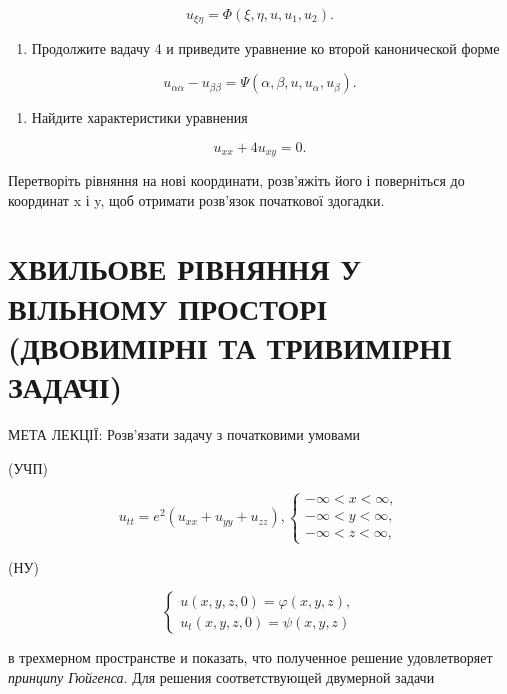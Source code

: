 \documentclass[
  ukrainian,
]{article}
\providecommand{\tightlist}{%
  \setlength{\itemsep}{0pt}\setlength{\parskip}{0pt}}
\begin{document}
\[
u_{\xi\eta} = \Phi(\xi, \eta, u, u_1, u_2).
\]

\begin{enumerate}
\def\labelenumi{\arabic{enumi}.}
\setcounter{enumi}{4}
\tightlist
\item
  Продолжите вадачу 4 и приведите уравнение ко второй канонической форме
\end{enumerate}

\[
u_{\alpha\alpha} - u_{\beta\beta} = \Psi(\alpha, \beta, u, u_{\alpha}, u_{\beta}).
\]

\begin{enumerate}
\def\labelenumi{\arabic{enumi}.}
\setcounter{enumi}{5}
\tightlist
\item
  Найдите характеристики уравнения
\end{enumerate}

\[
u_{xx} + 4u_{xy} = 0.
\]

Перетворіть рівняння на нові координати, розв'яжіть його і поверніться
до координат x і y, щоб отримати розв'язок початкової здогадки.

\section{ХВИЛЬОВЕ РІВНЯННЯ У ВІЛЬНОМУ ПРОСТОРІ (ДВОВИМІРНІ ТА ТРИВИМІРНІ
ЗАДАЧІ)}\label{ux445ux432ux438ux43bux44cux43eux432ux435-ux440ux456ux432ux43dux44fux43dux43dux44f-ux443-ux432ux456ux43bux44cux43dux43eux43cux443-ux43fux440ux43eux441ux442ux43eux440ux456-ux434ux432ux43eux432ux438ux43cux456ux440ux43dux456-ux442ux430-ux442ux440ux438ux432ux438ux43cux456ux440ux43dux456-ux437ux430ux434ux430ux447ux456}

МЕТА ЛЕКЦІЇ: Розв'язати задачу з початковими умовами

(УЧП)

\[
u_{tt} = e^{2} (u_{xx} + u_{yy} + u_{zz}),
\begin{cases} -\infty < x < \infty, \\ -\infty < y < \infty, \\ -\infty < z < \infty, \end{cases}
\]

(НУ)

\[
\begin{cases} u(x, y, z, 0) = \varphi(x, y, z), \\ u_{t}(x, y, z, 0) = \psi(x, y, z) \end{cases}
\]

в трехмерном пространстве и показать, что полученное решение
удовлетворяет \emph{принципу Гюйгенса}. Для решения соответствующей
двумерной задачи
\end{document}
